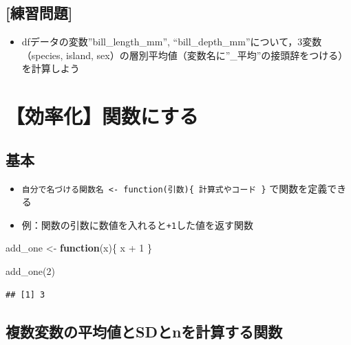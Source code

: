 \documentclass[
  xelatex,ja=standard, b5paper]{bxjsbook}
\newenvironment{Shaded}{\begin{snugshade}}{\end{snugshade}}
\newcommand{\ControlFlowTok}[1]{\textcolor[rgb]{0.13,0.29,0.53}{\textbf{#1}}}
\newcommand{\DecValTok}[1]{\textcolor[rgb]{0.00,0.00,0.81}{#1}}
\newcommand{\FunctionTok}[1]{\textcolor[rgb]{0.00,0.00,0.00}{#1}}
\newcommand{\NormalTok}[1]{#1}
\newcommand{\OtherTok}[1]{\textcolor[rgb]{0.56,0.35,0.01}{#1}}
\newcommand{\SpecialCharTok}[1]{\textcolor[rgb]{0.00,0.00,0.00}{#1}}
\providecommand{\tightlist}{%
  \setlength{\itemsep}{0pt}\setlength{\parskip}{0pt}}
\begin{document}
\hypertarget{ux7df4ux7fd2ux554fux984c-16}{%
\subsection{{[}練習問題{]}}\label{ux7df4ux7fd2ux554fux984c-16}}

\begin{itemize}
\tightlist
\item
  dfデータの変数''bill\_length\_mm'', ``bill\_depth\_mm''について，3変数（species, island, sex）の層別平均値（変数名に''\_平均''の接頭辞をつける）を計算しよう
\end{itemize}

\hypertarget{su-fun}{%
\section{【効率化】関数にする}\label{su-fun}}

\hypertarget{su-fun-st}{%
\subsection{基本}\label{su-fun-st}}

\begin{itemize}
\tightlist
\item
  \texttt{自分で名づける関数名\ \textless{}-\ function(引数)\{\ 計算式やコード\ \}} で関数を定義できる
\item
  例：関数の引数に数値を入れると\texttt{+1}した値を返す関数
\end{itemize}

\begin{Shaded}
\begin{Highlighting}[]
\NormalTok{add\_one }\OtherTok{\textless{}{-}} 
  \ControlFlowTok{function}\NormalTok{(x)\{}
\NormalTok{    x }\SpecialCharTok{+} \DecValTok{1}
\NormalTok{  \}}

\FunctionTok{add\_one}\NormalTok{(}\DecValTok{2}\NormalTok{)}
\end{Highlighting}
\end{Shaded}

\begin{verbatim}
## [1] 3
\end{verbatim}

\hypertarget{su-fun-meansdn}{%
\subsection{複数変数の平均値とSDとnを計算する関数}\label{su-fun-meansdn}}
\end{document}
